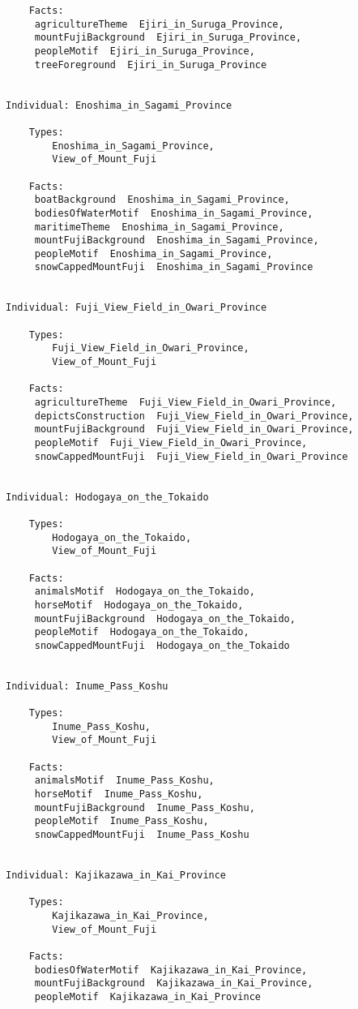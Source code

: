 \documentclass[titlepage,a4paper,12pt,oneside]{book}
\begin{document}
\begin{appendices}
\begin{lstlisting}
    Facts:  
     agricultureTheme  Ejiri_in_Suruga_Province,
     mountFujiBackground  Ejiri_in_Suruga_Province,
     peopleMotif  Ejiri_in_Suruga_Province,
     treeForeground  Ejiri_in_Suruga_Province
    
    
Individual: Enoshima_in_Sagami_Province

    Types: 
        Enoshima_in_Sagami_Province,
        View_of_Mount_Fuji
    
    Facts:  
     boatBackground  Enoshima_in_Sagami_Province,
     bodiesOfWaterMotif  Enoshima_in_Sagami_Province,
     maritimeTheme  Enoshima_in_Sagami_Province,
     mountFujiBackground  Enoshima_in_Sagami_Province,
     peopleMotif  Enoshima_in_Sagami_Province,
     snowCappedMountFuji  Enoshima_in_Sagami_Province
    
    
Individual: Fuji_View_Field_in_Owari_Province

    Types: 
        Fuji_View_Field_in_Owari_Province,
        View_of_Mount_Fuji
    
    Facts:  
     agricultureTheme  Fuji_View_Field_in_Owari_Province,
     depictsConstruction  Fuji_View_Field_in_Owari_Province,
     mountFujiBackground  Fuji_View_Field_in_Owari_Province,
     peopleMotif  Fuji_View_Field_in_Owari_Province,
     snowCappedMountFuji  Fuji_View_Field_in_Owari_Province
    
    
Individual: Hodogaya_on_the_Tokaido

    Types: 
        Hodogaya_on_the_Tokaido,
        View_of_Mount_Fuji
    
    Facts:  
     animalsMotif  Hodogaya_on_the_Tokaido,
     horseMotif  Hodogaya_on_the_Tokaido,
     mountFujiBackground  Hodogaya_on_the_Tokaido,
     peopleMotif  Hodogaya_on_the_Tokaido,
     snowCappedMountFuji  Hodogaya_on_the_Tokaido
    
    
Individual: Inume_Pass_Koshu

    Types: 
        Inume_Pass_Koshu,
        View_of_Mount_Fuji
    
    Facts:  
     animalsMotif  Inume_Pass_Koshu,
     horseMotif  Inume_Pass_Koshu,
     mountFujiBackground  Inume_Pass_Koshu,
     peopleMotif  Inume_Pass_Koshu,
     snowCappedMountFuji  Inume_Pass_Koshu
    
    
Individual: Kajikazawa_in_Kai_Province

    Types: 
        Kajikazawa_in_Kai_Province,
        View_of_Mount_Fuji
    
    Facts:  
     bodiesOfWaterMotif  Kajikazawa_in_Kai_Province,
     mountFujiBackground  Kajikazawa_in_Kai_Province,
     peopleMotif  Kajikazawa_in_Kai_Province
    

\end{lstlisting}
\end{appendices}
\end{document}
